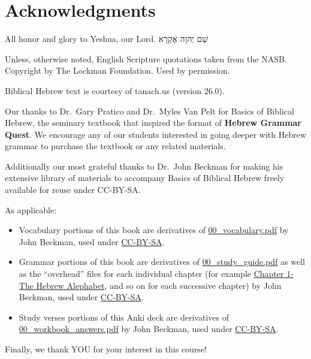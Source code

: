 \documentclass[
]{turabian-researchpaper}
\providecommand{\tightlist}{%
  \setlength{\itemsep}{0pt}\setlength{\parskip}{0pt}}
\begin{document}
\hypertarget{acknowledgments}{%
\section*{Acknowledgments}\label{acknowledgments}}

All honor and glory to Yeshua, our Lord. שֵׁם יְהוָה אֶקְרָא

Unless, otherwise noted, English Scripture quotations taken from the NASB. Copyright by The Lockman Foundation. Used by permission.

Biblical Hebrew text is courtesy of tanach.us (version 26.0).

Our thanks to Dr.~Gary Pratico and Dr.~Myles Van Pelt for Basics of Biblical Hebrew, the seminary textbook that inspired the format of \textbf{Hebrew Grammar Quest}. We encourage any of our students interested in going deeper with Hebrew grammar to purchase the textbook or any related materials.

Additionally our most grateful thanks to Dr.~John Beckman for making his extensive library of materials to accompany Basics of Biblical Hebrew freely available for reuse under CC-BY-SA.

As applicable:

\begin{itemize}
\tightlist
\item
  Vocabulary portions of this book are derivatives of \href{https://hebrewsyntax.org/bbh2new/00_vocabulary.pdf}{00\_vocabulary.pdf} by John Beckman, used under \href{https://creativecommons.org/licenses/by-nc-sa/4.0/}{CC-BY-SA}.
\item
  Grammar portions of this book are derivatives of \href{https://hebrewsyntax.org/bbh2new/00_study_guide.pdf}{00\_study\_guide.pdf} as well as the ``overhead'' files for each individual chapter (for example \href{https://hebrewsyntax.org/bbh2new/01_overheads_bw.pdf}{Chapter 1-The Hebrew Alephabet}, and so on for each successive chapter) by John Beckman, used under \href{https://creativecommons.org/licenses/by-nc-sa/4.0/}{CC-BY-SA}.
\item
  Study verses portions of this Anki deck are derivatives of \href{https://hebrewsyntax.org/bbh2new/00_workbook_answers.pdf}{00\_workbook\_answers.pdf} by John Beckman, used under \href{https://creativecommons.org/licenses/by-nc-sa/4.0/}{CC-BY-SA}.
\end{itemize}

Finally, we thank YOU for your interest in this course!
\end{document}
